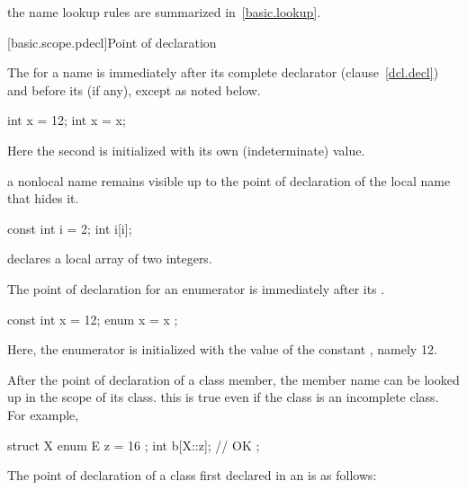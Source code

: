 \pnum
\enternote the name lookup rules are summarized in~\ref{basic.lookup}.
\exitnote

[basic.scope.pdecl]{Point of declaration}

\pnum
{}%
The  for a name is immediately after its
complete declarator (clause~\ref{dcl.decl}) and before its
 (if any), except as noted below. \enterexample

\begin{codeblock}
int x = 12;
{ int x = x; }
\end{codeblock}

Here the second  is initialized with its own (indeterminate)
value. \exitexample

\pnum
\enternote 
{}%
a nonlocal name remains visible up
to the point of declaration of the local name that hides it. \enterexample

\begin{codeblock}
const int  i = 2;
{ int  i[i]; }
\end{codeblock}

declares a local array of two integers. \exitexample \exitnote

\pnum
{}%
The point of declaration for an enumerator is immediately after its
. \enterexample

\begin{codeblock}
const int x = 12;
{ enum { x = x }; }
\end{codeblock}

Here, the enumerator  is initialized with the value of the
constant , namely 12. \exitexample

\pnum
After the point of declaration of a class member, the member name can be
looked up in the scope of its class. \enternote
{}%
this is true even if the class is an incomplete class. For example,

\begin{codeblock}
struct X {
	enum E { z = 16 };
	int b[X::z];            // OK
};
\end{codeblock}
\exitnoteb

\pnum
The point of declaration of a class first declared in an
 is as follows:

